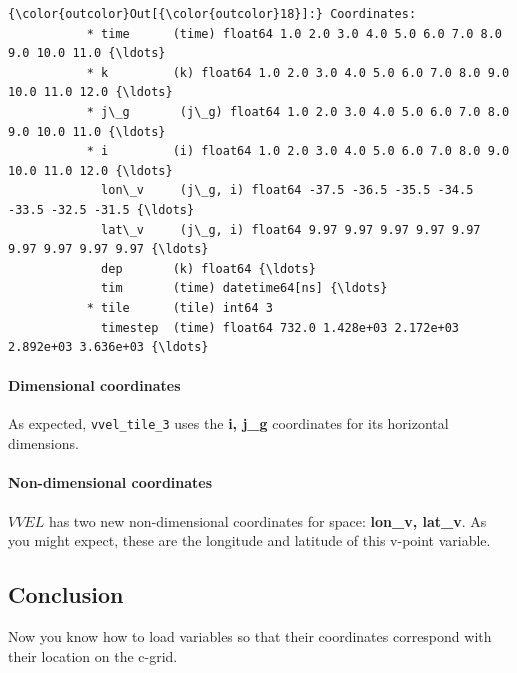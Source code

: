 \documentclass[11pt]{article}
\begin{document}
\begin{Verbatim}[commandchars=\\\{\}]
{\color{outcolor}Out[{\color{outcolor}18}]:} Coordinates:
           * time      (time) float64 1.0 2.0 3.0 4.0 5.0 6.0 7.0 8.0 9.0 10.0 11.0 {\ldots}
           * k         (k) float64 1.0 2.0 3.0 4.0 5.0 6.0 7.0 8.0 9.0 10.0 11.0 12.0 {\ldots}
           * j\_g       (j\_g) float64 1.0 2.0 3.0 4.0 5.0 6.0 7.0 8.0 9.0 10.0 11.0 {\ldots}
           * i         (i) float64 1.0 2.0 3.0 4.0 5.0 6.0 7.0 8.0 9.0 10.0 11.0 12.0 {\ldots}
             lon\_v     (j\_g, i) float64 -37.5 -36.5 -35.5 -34.5 -33.5 -32.5 -31.5 {\ldots}
             lat\_v     (j\_g, i) float64 9.97 9.97 9.97 9.97 9.97 9.97 9.97 9.97 9.97 {\ldots}
             dep       (k) float64 {\ldots}
             tim       (time) datetime64[ns] {\ldots}
           * tile      (tile) int64 3
             timestep  (time) float64 732.0 1.428e+03 2.172e+03 2.892e+03 3.636e+03 {\ldots}
\end{Verbatim}
            
    \paragraph{Dimensional coordinates}\label{dimensional-coordinates}

As expected, \texttt{vvel\_tile\_3} uses the \textbf{i, j\_g}
coordinates for its horizontal dimensions.

\paragraph{Non-dimensional
coordinates}\label{non-dimensional-coordinates}

\(VVEL\) has two new non-dimensional coordinates for space:
\textbf{lon\_v, lat\_v}. As you might expect, these are the longitude
and latitude of this v-point variable.

    \subsection{Conclusion}\label{conclusion}

Now you know how to load variables so that their coordinates correspond
with their location on the c-grid.


    
    
    
    
\end{document}
